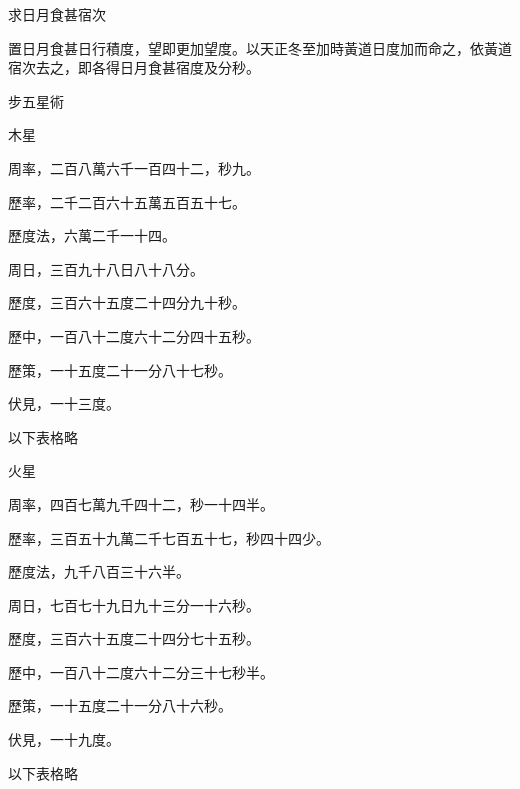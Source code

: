 \begin{pinyinscope}
 求日月食甚宿次



 置日月食甚日行積度，望即更加望度。以天正冬至加時黃道日度加而命之，依黃道宿次去之，即各得日月食甚宿度及分秒。



 步五星術



 木星



 周率，二百八萬六千一百四十二，秒九。



 歷率，二千二百六十五萬五百五十七。



 歷度法，六萬二千一十四。



 周日，三百九十八日八十八分。



 歷度，三百六十五度二十四分九十秒。



 歷中，一百八十二度六十二分四十五秒。



 歷策，一十五度二十一分八十七秒。



 伏見，一十三度。



 以下表格略



 火星



 周率，四百七萬九千四十二，秒一十四半。



 歷率，三百五十九萬二千七百五十七，秒四十四少。



 歷度法，九千八百三十六半。



 周日，七百七十九日九十三分一十六秒。



 歷度，三百六十五度二十四分七十五秒。



 歷中，一百八十二度六十二分三十七秒半。



 歷策，一十五度二十一分八十六秒。



 伏見，一十九度。



 以下表格略




\end{pinyinscope}

